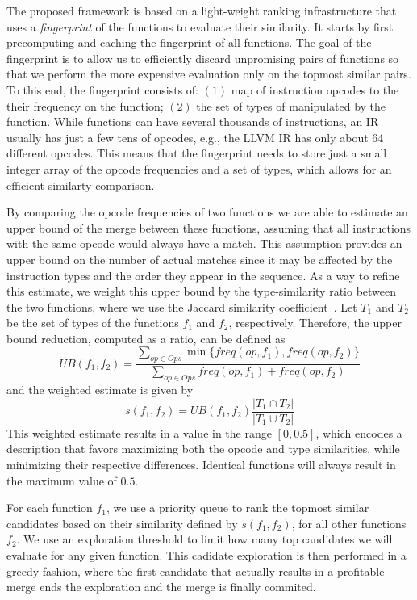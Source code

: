 The proposed framework is based on a light-weight ranking infrastructure that
uses a \textit{fingerprint} of the functions to evaluate their similarity.
It starts by first precomputing and caching the fingerprint of all functions.
The goal of the fingerprint is to allow us to efficiently discard unpromising
pairs of functions so that we perform the more expensive evaluation only on
the topmost similar pairs.
To this end, the fingerprint consists of: $(1)$ map of instruction opcodes to
the their frequency on the function; $(2)$ the set of types of manipulated by
the function.
While functions can have several thousands of instructions, an IR usually has
just a few tens of opcodes, e.g., the LLVM IR has only about 64 different
opcodes.
This means that the fingerprint needs to store just a small integer array of the
opcode frequencies and a set of types, which allows for an efficient similarty
comparison.

By comparing the opcode frequencies of two functions we are able to estimate
an upper bound of the merge between these functions, assuming that all
instructions with the same opcode would always have a match.
This assumption provides an upper bound on the number of actual matches since
it may be affected by the instruction types and the order they appear in the
sequence.
As a way to refine this estimate, we weight this upper bound by the
type-similarity ratio between the two functions, where we use the Jaccard
similarity coefficient~\cite{jaccard}.
Let $T_1$ and $T_2$ be the set of types of the functions $f_1$ and $f_2$,
respectively.
Therefore, the upper bound reduction, computed as a ratio, can be defined as
\[
   U\!B(f_1,f_2) = \frac{\sum\limits_{op \in Ops} \min\{freq(op,f_1),freq(op,f_2)\}}{\sum\limits_{op \in Ops} freq(op,f_1)+freq(op,f_2)}
\]
and the weighted estimate is given by
\[
     s(f_1,f_2) = U\!B(f_1,f_2) \frac{|T_1 \cap T_2|}{|T_1 \cup T_2|}
\]
This weighted estimate results in a value in the range $[0,0.5]$,
which encodes a description that favors maximizing both the opcode and type
similarities, while minimizing their respective differences.
Identical functions will always result in the maximum value of $0.5$.

For each function $f_1$, we use a priority queue to rank the topmost
similar candidates based on their similarity defined by $s(f_1,f_2)$, for all
other functions $f_2$.
We use an exploration threshold to limit how many top candidates we will
evaluate for any given function.
This cadidate exploration is then performed in a greedy fashion, where the first
candidate that actually results in a profitable merge ends the exploration and
the merge is finally commited.


